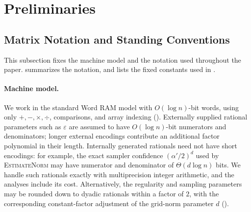 \documentclass[11pt]{article}
\theoremstyle{definition}
\renewcommand{\label}[1]{}%
\newcommand{\EstimateNorm}{\textnormal{\textsc{EstimateNorm}}}
\begin{document}
\section{Preliminaries}
\label{sec:prelim}

\subsection{Matrix Notation and Standing Conventions}
\label{sec:notation}

This subsection fixes the machine model and the notation used throughout the paper.  summarizes the notation, and  lists the fixed constants used in .

\paragraph{Machine model.}
We work in the standard Word RAM model with $O(\log n)$-bit words, using only $+, -, \times, \div$, comparisons, and array indexing (). Externally supplied rational parameters such as $\varepsilon$ are assumed to have $O(\log n)$-bit numerators and denominators; longer external encodings contribute an additional factor polynomial in their length. Internally generated rationals need not have short encodings: for example, the exact sampler confidence $(\alpha'/2)^d$ used by \EstimateNorm{} may have numerator and denominator of $\Theta(d\log n)$ bits. We handle such rationals exactly with multiprecision integer arithmetic, and the analyses include its cost. Alternatively, the regularity and sampling parameters may be rounded down to dyadic rationals within a factor of $2$, with the corresponding constant-factor adjustment of the grid-norm parameter $d$ ().
\end{document}
